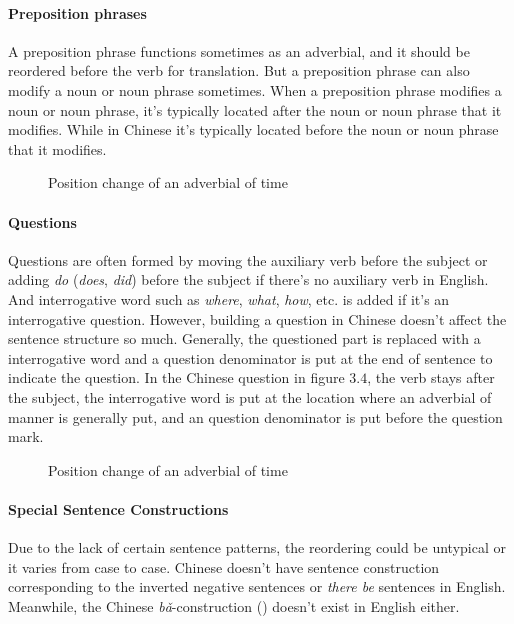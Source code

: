 \paragraph{Preposition phrases}
A preposition phrase functions sometimes as an adverbial, and it should be reordered before the verb for translation. But a preposition phrase can also modify a noun or noun phrase sometimes. When a preposition phrase modifies a noun or noun phrase, it's typically located after the noun or noun phrase that it modifies. While in Chinese it's typically located before the noun or noun phrase that it modifies.

\begin{figure}[H]
\centering

\caption{Position change of an adverbial of time}
\end{figure}

\paragraph{Questions}
Questions are often formed by moving the auxiliary verb before the subject or adding \textit{do} (\textit{does}, \textit{did}) before the subject if there's no auxiliary verb in English. And interrogative word such as \textit{where}, \textit{what}, \textit{how}, etc. is added if it's an interrogative question. However, building a question in Chinese doesn't affect the sentence structure so much. Generally, the questioned part is replaced with a interrogative word and a question denominator is put at the end of sentence to indicate the question. In the Chinese question in figure $3.4$, the verb stays after the subject, the interrogative word is put at the location where an adverbial of manner is generally put, and an question denominator is put before the question mark.

\begin{figure}[H]
\centering

\caption{Position change of an adverbial of time}
\end{figure}

\paragraph{Special Sentence Constructions}
Due to the lack of certain sentence patterns, the reordering could be untypical or it varies from case to case. Chinese doesn't have sentence construction corresponding to the inverted negative sentences or \textit{there be} sentences in English. Meanwhile, the Chinese \linebreak\textit{bǎ}-construction () doesn't exist in English either.

